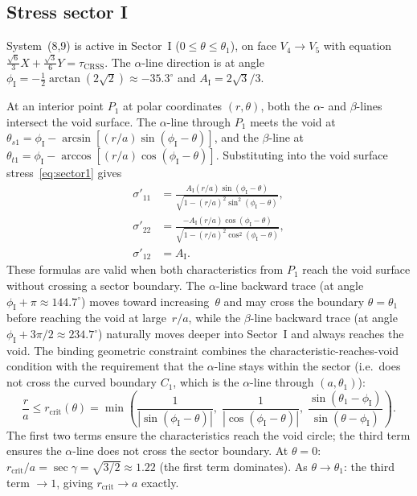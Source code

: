 \documentclass{svjour3} %
\newcommand{\tcrss}{\tau_{\mathrm{CRSS}}}
\begin{document}
\subsection{Stress sector I}

System~(8,9) is active in Sector~I ($0 \leq \theta \leq \theta_1$),
on face $V_4 \to V_5$ with equation
$\frac{\sqrt{6}}{3}X + \frac{\sqrt{3}}{6}Y = \tcrss$.
The $\alpha$-line direction is at angle
$\phi_{\mathrm{I}} = -\frac{1}{2}\arctan(2\sqrt{2}) \approx -35.3^\circ$
and $A_{\mathrm{I}} = 2\sqrt{3}/3$.

At an interior point $P_1$ at polar coordinates $(r, \theta)$,
both the $\alpha$- and $\beta$-lines intersect the void surface.
The $\alpha$-line through $P_1$ meets the void at
$\theta_{s1} = \phi_{\mathrm{I}} - \arcsin[(r/a)\sin(\phi_{\mathrm{I}} - \theta)]$,
and the $\beta$-line at
$\theta_{t1} = \phi_{\mathrm{I}} - \arccos[(r/a)\cos(\phi_{\mathrm{I}} - \theta)]$.
Substituting into the void surface stress~\eqref{eq:sector1} gives
\begin{align}
\label{eq:s11_sector_I}
\sigma'_{11} &= \frac{A_{\mathrm{I}}(r/a)\sin(\phi_{\mathrm{I}} - \theta)}
  {\sqrt{1 - (r/a)^2\sin^2(\phi_{\mathrm{I}} - \theta)}}, \\
\label{eq:s22_sector_I}
\sigma'_{22} &= \frac{-A_{\mathrm{I}}(r/a)\cos(\phi_{\mathrm{I}} - \theta)}
  {\sqrt{1 - (r/a)^2\cos^2(\phi_{\mathrm{I}} - \theta)}}, \\
\sigma'_{12} &= A_{\mathrm{I}}.
\end{align}
These formulas are valid when both characteristics from $P_1$ reach
the void surface without crossing a sector boundary. The
$\alpha$-line backward trace (at angle
$\phi_{\mathrm{I}} + \pi \approx 144.7^\circ$) moves toward
increasing~$\theta$ and may cross the boundary $\theta = \theta_1$
before reaching the void at large~$r/a$, while the $\beta$-line
backward trace (at angle
$\phi_{\mathrm{I}} + 3\pi/2 \approx 234.7^\circ$) naturally moves
deeper into Sector~I and always reaches the void. The binding
geometric constraint combines the characteristic-reaches-void
condition with the requirement that the $\alpha$-line stays within
the sector (i.e.\ does not cross the curved boundary $C_1$, which is
the $\alpha$-line through $(a, \theta_1)$):
\begin{equation}
\label{eq:rcrit_I}
\frac{r}{a} \leq r_{\mathrm{crit}}(\theta) =
  \min\!\left(\frac{1}{|\sin(\phi_{\mathrm{I}} - \theta)|},\;
              \frac{1}{|\cos(\phi_{\mathrm{I}} - \theta)|},\;
              \frac{\sin(\theta_1 - \phi_{\mathrm{I}})}
                   {\sin(\theta - \phi_{\mathrm{I}})}\right).
\end{equation}
The first two terms ensure the characteristics reach the void circle;
the third term ensures the $\alpha$-line does not cross the sector
boundary. At $\theta = 0$:
$r_{\mathrm{crit}}/a = \sec\gamma = \sqrt{3/2} \approx 1.22$
(the first term dominates).
As $\theta \to \theta_1$: the third term $\to 1$, giving
$r_{\mathrm{crit}} \to a$ exactly.
\end{document}
